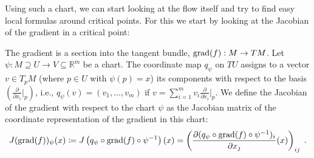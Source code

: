 Using such a chart, we can start looking at the flow itself and try to find easy local formulas around critical points. For this we start by looking at the Jacobian of the gradient in a critical point: 
\begin{definition}\label{def:morse-jacobeanOfTheGradient}
	The gradient is a section into the tangent bundle, $\mathrm{grad}(f):M\to TM$.
	Let $\psi: M\supseteq U\to V \subseteq \mathbb{R}^m$ be a chart. The coordinate map $q_{\psi}$ on $TU$ assigns to a vector $v \in T_pM$ (where $p \in U$ with $\psi(p) = x$) its components with respect to the basis $\left(\frac{\partial}{\partial x_i}\big|_p\right)$, i.e., $q_{\psi}(v) = (v_1, \ldots, v_m)$ if $v = \sum_{i=1}^m v_i \frac{\partial}{\partial x_i}\big|_p$.
	We define the Jacobian of the gradient with respect to the chart $\psi$ as the Jacobian matrix of the coordinate representation of the gradient in this chart:
	\begin{equation*}
		J(\mathrm{grad}(f))_\psi(x) \coloneq J\left(q_{\psi}\circ \mathrm{grad}(f)\circ \psi^{-1}\right)(x) = \left(\frac{\partial (q_{\psi}\circ \mathrm{grad}(f)\circ \psi^{-1})_i}{\partial x_j}(x)\right)_{ij} \;.
	\end{equation*}
\end{definition}


